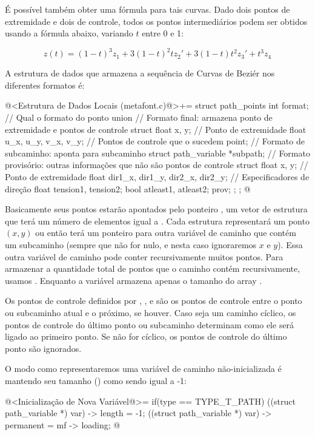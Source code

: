 É possível também obter uma fórmula para tais curvas. Dado dois pontos
de extremidade e dois de controle, todos os pontos intermediários
podem ser obtidos usando a fórmula abaixo, variando $t$ entre 0 e 1:

$$
z(t) = (1-t)^3z_1 + 3(1-t)^2tz_2' + 3(1-t)t^2z_3'+t^3z_4
$$

A estrutura de dados que armazena a sequência de Curvas de Beziér nos
diferentes formatos é:

\iniciocodigo
@<Estrutura de Dados Locais (metafont.c)@>+=
struct path_points{
  int format; // Qual o formato do ponto
  union{
    // Formato final: armazena ponto de extremidade e pontos de controle
    struct{
      float x, y; // Ponto de extremidade
      float u_x, u_y, v_x, v_y;   // Pontos de controle que o sucedem
    } point;
    // Formato de subcaminho: aponta para subcaminho
    struct path_variable *subpath;
    // Formato provisório: outras informações que não são pontos de controle
    struct{
      float x, y; // Ponto de extremidade
      float dir1_x, dir1_y, dir2_x, dir2_y; // Especificadores de direção
      float tension1, tension2;
      bool atleast1, atleast2;
    } prov;
  };
};
@
\fimcodigo

Basicamente seus pontos estarão apontados pelo
ponteiro , um vetor de estrutura que terá um número
de elementos igual a . Cada estrutura representará
um ponto $(x, y)$ ou então terá um ponteiro para outra variável de
caminho que contém um subcaminho (sempre que  não
for nulo, e nesta caso ignoraremos $x$ e $y$). Essa outra variável de
caminho pode conter recursivamente muitos pontos. Para armazenar a
quantidade total de pontos que o caminho contém recursivamente,
usamos . Enquanto a
variável  armazena apenas o tamanho do
array .

Os pontos de controle definidos
por , , 
e  são os pontos de controle entre o ponto ou
subcaminho atual e o próximo, se houver. Caso seja um caminho cíclico,
os pontos de controle do último ponto ou subcaminho determinam como
ele será ligado ao primeiro ponto. Se não for cíclico, os pontos de
controle do último ponto são ignorados.

O modo como representaremos uma variável de caminho não-inicializada é
mantendo seu tamanho () como sendo igual a -1:

\iniciocodigo
@<Inicialização de Nova Variável@>=
if(type == TYPE_T_PATH){
  ((struct path_variable *) var) -> length = -1;
  ((struct path_variable *) var) -> permanent = mf -> loading;
}
@
\fimcodigo

